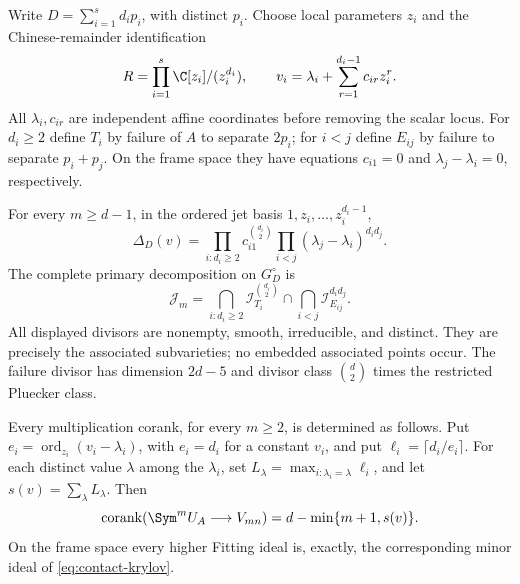 Write $D=\sum_{i=1}^s d_i p_i$, with distinct $p_i$. Choose local
parameters $z_i$ and the Chinese-remainder identification
\[
 R=\prod_{i=1}^s\C[z_i]/(z_i^{d_i}),\qquad
 v_i=\lambda_i+\sum_{r=1}^{d_i-1}c_{ir}z_i^r.
\]
All $\lambda_i,c_{ir}$ are independent affine coordinates before
removing the scalar locus. For $d_i\ge2$ define $T_i$ by failure
of $A$ to separate $2p_i$; for $i<j$ define $E_{ij}$ by failure
to separate $p_i+p_j$. On the frame space they have equations
$c_{i1}=0$ and $\lambda_j-\lambda_i=0$, respectively.

\begin{theorem}\label{thm:contact-factorization}
For every $m\ge d-1$, in the ordered jet basis $1,z_i,\ldots,z_i^{d_i-1}$,
\begin{equation}\label{eq:contact-confluent-determinant}
 \Delta_D(v)=
 \prod_{i:d_i\ge2}c_{i1}^{\binom{d_i}{2}}
 \prod_{i<j}(\lambda_j-\lambda_i)^{d_i d_j}.
\end{equation}
The complete primary decomposition on $G_D^\circ$ is
\begin{equation}\label{eq:contact-full-primary}
 \mathcal J_m=
 \bigcap_{i:d_i\ge2}\mathcal I_{T_i}^{\binom{d_i}{2}}
 \cap\bigcap_{i<j}\mathcal I_{E_{ij}}^{d_i d_j}.
\end{equation}
All displayed divisors are nonempty, smooth, irreducible, and
distinct. They are precisely the associated subvarieties; no
embedded associated points occur. The failure divisor has dimension
$2d-5$ and divisor class $\binom d2$ times the restricted Pluecker
class.

Every multiplication corank, for every $m\ge2$, is determined as
follows. Put $e_i=\operatorname{ord}_{z_i}(v_i-\lambda_i)$, with
$e_i=d_i$ for a constant $v_i$, and put $\ell_i=\lceil d_i/e_i\rceil$.
For each distinct value $\lambda$ among the $\lambda_i$, set
$L_\lambda=\max_{i:\lambda_i=\lambda}\ell_i$, and let
$s(v)=\sum_\lambda L_\lambda$. Then
\begin{equation}\label{eq:contact-all-coranks}
 \operatorname{corank}(\Sym^m U_A\longrightarrow V_{mn})
                 =d-\min\{m+1,s(v)\}.
\end{equation}
On the frame space every higher Fitting ideal is, exactly, the
corresponding minor ideal of \eqref{eq:contact-krylov}.
\end{theorem}
